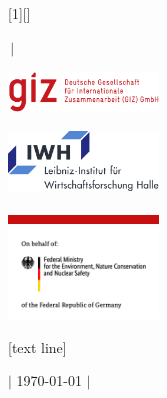 \renewcommand{\inserttitlegraphic}{
\parbox[b][2.5cm][t]{4cm}{\includegraphics[width = 4cm, keepaspectratio]{pictures/GIZ_Logo.png}}  \hspace{0.1cm} \parbox[b][2.5cm][t]{4cm}{\includegraphics[width = 4cm, keepaspectratio]{pictures/IWH_Logo_RGB_DE_Grossformat.png}} \hfill \parbox[b][2.5cm][t]{3.21cm}{\includegraphics[keepaspectratio,width=4.00cm]{pictures/seperationbar.png} \\ \includegraphics[width = 4cm, keepaspectratio]{pictures/BMWI_logo.png}}
}
[1][]
{	
	\vspace{2.75cm}
  \begin{center}\textbf{\inserttitle}\end{center}\par
  \begin{center}\insertsubtitle\end{center}\par
  \insertauthor $\, \vert$ \insertdate \par
  \insertinstitute\par
	\vspace{0.25cm}
  \inserttitlegraphic


}


[text line]{%
  \parbox{\linewidth}{\vspace*{-8pt} $\vert$ \hspace{1mm} \today \hspace{1mm} $\vert$ \hfill}}

\linespread{1.2}




